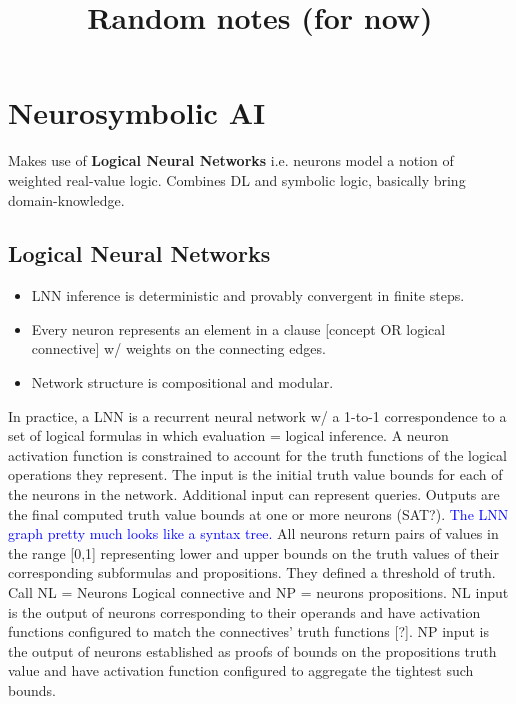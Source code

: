 \documentclass[a4paper,11pt]{article}
\begin{document}
\date{}

\title{Random notes (for now)}


\maketitle 

\section{Neurosymbolic AI}
Makes use of \textbf{Logical Neural Networks} i.e. neurons model a notion of weighted real-value logic. Combines DL and symbolic logic, basically bring domain-knowledge.

\subsection{Logical Neural Networks \cite{riegel2020logical}}
\begin{itemize}
    \item LNN inference is deterministic and provably convergent in finite steps.
    \item Every neuron represents an element in a clause [concept OR logical connective] w/ weights on the connecting edges. 
    \item Network structure is compositional and modular. 
\end{itemize}
In practice, a LNN is a recurrent neural network w/ a 1-to-1 correspondence to a set of logical formulas in which evaluation = logical inference. A neuron activation function is constrained to 
account for the truth functions of the logical operations they represent. The input is the initial truth value bounds for each of the neurons in the network. Additional input can represent queries. 
Outputs are the final computed truth value bounds at one or more neurons (SAT?). \textcolor{blue}{The LNN graph pretty much looks like a syntax tree.} \newline
All neurons return pairs of values in the range [0,1] representing lower and upper bounds on the truth values of their corresponding subformulas and propositions. They defined a threshold of truth. 
Call NL = Neurons Logical connective and NP = neurons propositions. NL input is the output of neurons corresponding to their operands and have activation functions configured to match the connectives' truth functions [?].
NP input is the output of neurons established as proofs of bounds on the propositions truth value and have activation function configured to aggregate the tightest such bounds. 
\end{document}

